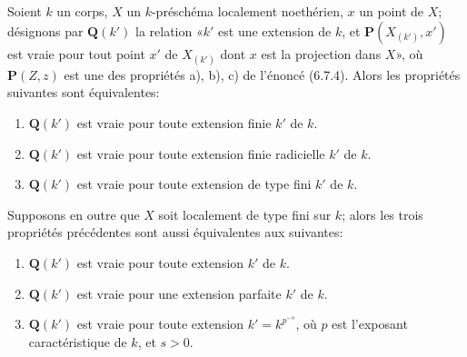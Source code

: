 
\begin{proposition}[6.7.7]
\label{IV.2.s6.7.7-fr}
Soient $k$ un corps, $X$ un $k$-préschéma localement noethérien, $x$ un
point de $X$; désignons par $\boldsymbol{Q}(k')$ la relation «$k'$ est une extension de
$k$, et $\boldsymbol{P}(X_{(k')},x')$ est vraie pour tout point $x'$ de $X_{(k')}$ dont
$x$ est la projection dans $X$», où $\boldsymbol{P}(Z,z)$ est une des propriétés \textup{a),
b), c)} de l'énoncé \textup{(6.7.4)}. Alors les propriétés suivantes sont équivalentes:
\begin{enumerate}
\item[\textup{a)}] $\boldsymbol{Q}(k')$ est vraie pour toute extension finie $k'$ de $k$.
\item[\textup{b)}] $\boldsymbol{Q}(k')$ est vraie pour toute extension finie radicielle $k'$ de $k$.
\item[\textup{c)}] $\boldsymbol{Q}(k')$ est vraie pour toute extension de type fini $k'$ de $k$.
\end{enumerate}
Supposons en outre que $X$ soit localement de type fini sur $k$; alors les
trois propriétés précédentes sont aussi équivalentes aux suivantes:
\begin{enumerate}
\item[\textup{d)}] $\boldsymbol{Q}(k')$ est vraie pour toute extension $k'$ de $k$.
\item[\textup{e)}] $\boldsymbol{Q}(k')$ est vraie pour \textup{une} extension parfaite $k'$ de $k$.
\item[\textup{f)}] $\boldsymbol{Q}(k')$ est vraie pour toute extension $k'=k^{p^{-s}}$, où $p$ est
l'exposant caractéristique de $k$, et $s>0$.
\end{enumerate}
\end{proposition}

